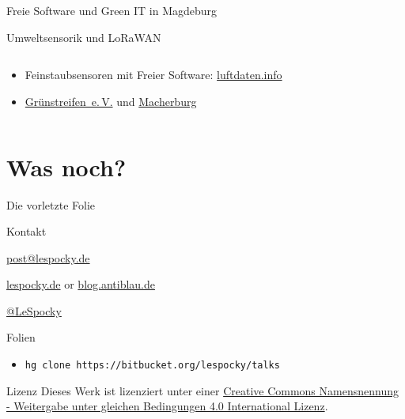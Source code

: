 \documentclass[t]{beamer}
\begin{document}
\begin{frame}{Freie Software und Green IT in Magdeburg}
            \begin{block}{Umweltsensorik und LoRaWAN}
    \begin{columns}[T]
        \begin{column}{0.65\textwidth}
                \begin{itemize}
                    \item Feinstaubsensoren mit Freier Software:
                        \href{https://luftdaten.info/faq/\#toggle-id-17}{luftdaten.info}
                    \item \href{https://gruenstreifen-ev.de/stadt-gruen/umweltsensorik/}{Grünstreifen~e.\,V.}
                        und \href{https://macherburg.de/umweltdaten-info.html}{Macherburg}
                \end{itemize}
        \end{column}
        \begin{column}{0.3\textwidth}
        \end{column}
    \end{columns}
            \end{block}
\end{frame}

\section*{Was noch?}

\begin{frame}{Die vorletzte Folie}
    \begin{block}{Kontakt}
        \begin{description}[Twitter]
            \item [E-Mail] \href{mailto:post@lespocky.de}{post@lespocky.de}
            \item [WWW] \href{http://www.lespocky.de/}{lespocky.de} or
                    \href{http://blog.antiblau.de/}{blog.antiblau.de}
            \item [Twitter] \href{https://twitter.com/LeSpocky}{@LeSpocky}
        \end{description}
    \end{block}
    \begin{block}{Folien}
        \begin{itemize}
            \item \texttt{hg clone https://bitbucket.org/lespocky/talks}
        \end{itemize}
    \end{block}
    \begin{block}{Lizenz}
        Dieses Werk ist lizenziert unter einer
        \href{http://creativecommons.org/licenses/by-sa/4.0/}{Creative Commons
        Namensnennung - Weitergabe unter gleichen Bedingungen 4.0 International
        Lizenz}.
    \end{block}
\end{frame}
\end{document}
